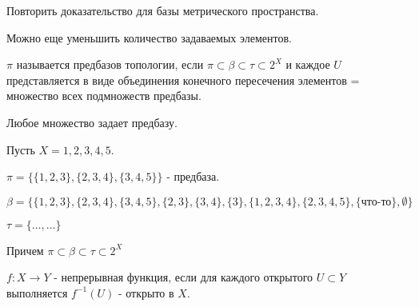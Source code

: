 \begin{exercise}
    Повторить доказательство для базы метрического пространства.
\end{exercise}

Можно еще уменьшить количество задаваемых элементов.

\begin{definition}
    $\pi$ называется предбазов топологии, если $\pi \subset \beta \subset \tau \subset 2^X$ и каждое $U$ представляется в виде объединения конечного пересечения элементов = множество всех подмножеств предбазы.
\end{definition}

\begin{nota_bene}
    Любое множество задает предбазу.
\end{nota_bene}

\wip
\begin{example}
    Пусть $X = {1,2,3,4,5}$.

    $\pi = \{\{1,2,3\}, \{2,3,4\}, \{3,4,5\}\}$ - предбаза.

    $\beta = \{\{1,2,3\}, \{2,3,4\}, \{3,4,5\}, \{2,3\}, \{3,4\}, \{3\}, \{1,2,3,4\}, \{2,3,4,5\}, \{\textbf{что-то}\}, \emptyset\}$

    $\tau = \{\ldots, \ldots\}$

    Причем $\pi \subset \beta \subset \tau \subset 2^X$
\end{example}

\begin{definition}
    $f: X \rightarrow Y$ - непрерывная функция, если для каждого открытого $U \subset Y$ выполняется $f^{-1}(U)$ - открыто в $X$.
\end{definition}
